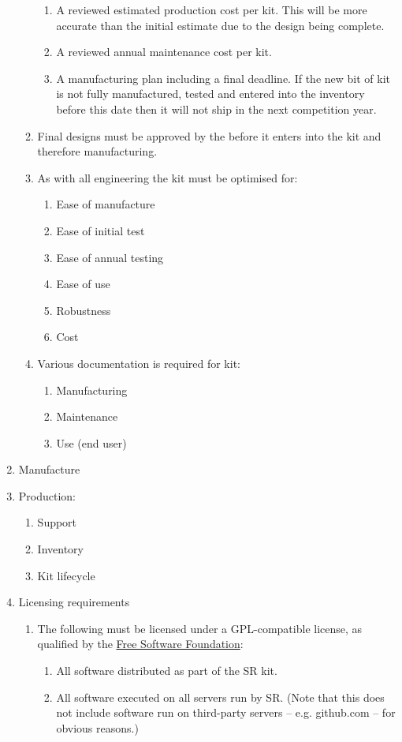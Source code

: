 \begin{enumerate}
\begin{enumerate}
\begin{enumerate}
        \item A reviewed estimated production cost per kit. This will be more accurate than the initial estimate due to the design being complete.
        \item A reviewed annual maintenance cost per kit.
        \item A manufacturing plan including a final deadline. If the new bit of kit is not fully manufactured, tested and entered into the inventory before this date then it will not ship in the next competition year.
      \end{enumerate}
    \item Final designs must be approved by the  before it enters into the kit and therefore manufacturing.
    \item As with all engineering the kit must be optimised for:
      \begin{enumerate}
        \item Ease of manufacture
        \item Ease of initial test
        \item Ease of annual testing
        \item Ease of use
        \item Robustness
        \item Cost
      \end{enumerate}
    \item Various documentation is required for kit:
      \begin{enumerate}
        \item Manufacturing
        \item Maintenance
        \item Use (end user)
      \end{enumerate}
  \end{enumerate}
\item Manufacture
\item Production:
  \begin{enumerate}
  \item Support
  \item Inventory
  \item Kit lifecycle
  \end{enumerate}

\item Licensing requirements
  \begin{enumerate}

  \item The following must be licensed under a GPL-compatible license, as qualified by the \href{http://www.gnu.org/licenses/license-list.en.html#GPLCompatibleLicenses}{Free Software Foundation}:
    \begin{enumerate}
    \item All software distributed as part of the SR kit.
    \item All software executed on all servers run by SR. (Note that this does not include software run on third-party servers -- e.g. github.com -- for obvious reasons.)
    \end{enumerate}


\end{enumerate}
\end{enumerate}
